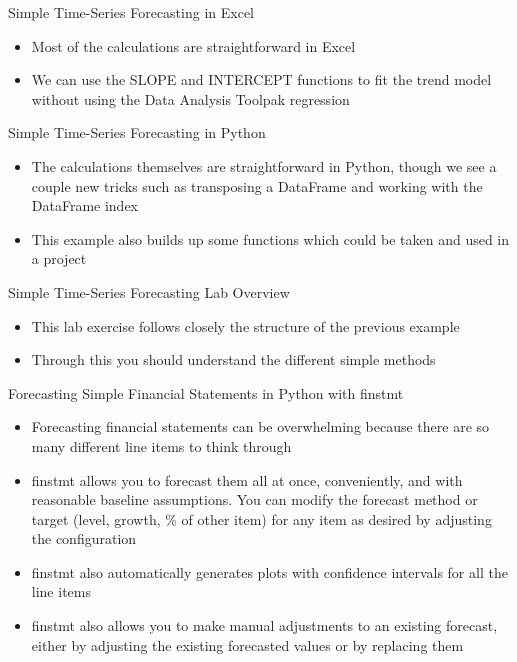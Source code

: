 \documentclass[]{article}
\begin{document}
\begin{section}{Simple Time-Series Forecasting in Excel}
\begin{itemize}
\item Most of the calculations are straightforward in Excel
\item We can use the SLOPE and INTERCEPT functions to fit the trend model without using the Data Analysis Toolpak regression
\end{itemize}
\end{section}
\begin{section}{Simple Time-Series Forecasting in Python}
\begin{itemize}
\item The calculations themselves are straightforward in Python, though we see a couple new tricks such as transposing a DataFrame and working with the DataFrame index
\item This example also builds up some functions which could be taken and used in a project
\end{itemize}
\end{section}
\begin{section}{Simple Time-Series Forecasting Lab Overview}
\begin{itemize}
\item This lab exercise follows closely the structure of the previous example
\item Through this you should understand the different simple methods
\end{itemize}
\end{section}
\begin{section}{Forecasting Simple Financial Statements in Python with finstmt}
\begin{itemize}
\item Forecasting financial statements can be overwhelming because there are so many different line items to think through
\item finstmt allows you to forecast them all at once, conveniently, and with reasonable baseline assumptions. You can modify the forecast method or target (level, growth, \% of other item) for any item as desired by adjusting the configuration
\item finstmt also automatically generates plots with confidence intervals for all the line items
\item finstmt also allows you to make manual adjustments to an existing forecast, either by adjusting the existing forecasted values or by replacing them
\end{itemize}
\end{section}
\end{document}
